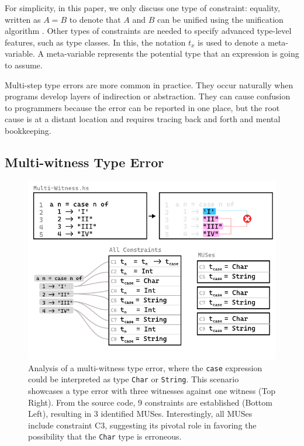 \documentclass[pdflatex,lineno,sn-nature,Numbered]{sn-jnl}%
\begin{document}
  For simplicity, in this paper, we only discuss one type of constraint: equality, written as $A = B$ to denote that $A$ and $B$ can be unified using the unification algorithm \cite{Robinson2012-hy}. Other types of constraints are needed to specify advanced type-level features, such as type classes. In this, the notation $t_x$ is used to denote a meta-variable. A meta-variable represents the potential type that an expression is going to assume. 

Multi-step type errors are more common in practice. They occur naturally when programs develop layers of indirection or abstraction. They can cause confusion to programmers because the error can be reported in one place, but the root cause is at a distant location and requires tracing back and forth and mental bookkeeping. 


\subsection{Multi-witness Type Error} \label{sec:multi-witness}

\begin{figure}[hbt]
    \centering
\includegraphics[width=0.8\linewidth]{images/Multi-Witness-MUS}
  \caption{\label{fig:multi-witness-2}
    Analysis of a multi-witness type error, where the \texttt{case} expression could be interpreted as type \texttt{Char} or \texttt{String}. This scenario showcases a type error with three witnesses against one witness (Top Right). From the source code, 9 constraints are established (Bottom Left), resulting in 3 identified MUSes. Interestingly, all MUSes include constraint C3, suggesting its pivotal role in favoring the possibility that the \texttt{Char} type is erroneous.
  }
  \end{figure}
\end{document}
